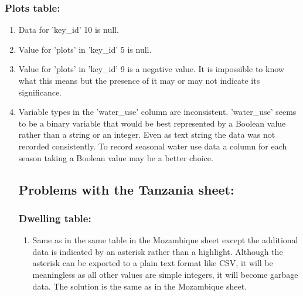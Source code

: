 \documentclass{article}
\begin{document}
\subsubsection{Plots table:}
\begin{enumerate}
    \item Data for 'key\_id' 10 is null.
    \item Value for 'plots' in 'key\_id' 5 is null.
    \item Value for 'plots' in 'key\_id' 9 is a negative value. It is impossible to know what this means but the presence of it may or may not indicate its significance.
    \item Variable types in the 'water\_use' column are inconsistent. 'water\_use' seems to be a binary variable that would be best represented by a Boolean value rather than a string or an integer. Even as text string the data was not recorded consistently. To record seasonal water use data a column for each season taking a Boolean value may be a better choice.
    \subsection{Problems with the Tanzania sheet:}
    \subsubsection{Dwelling table:}
    \begin{enumerate}
        \item Same as in the same table in the Mozambique sheet except the additional data is indicated by an asterisk rather than a highlight. Although the asterisk can be exported to a plain text format like CSV, it will be meaningless as all other values are simple integers, it will become garbage data. The solution is the same as in the Mozambique sheet.
    \end{enumerate}

\end{enumerate}
\end{document}
